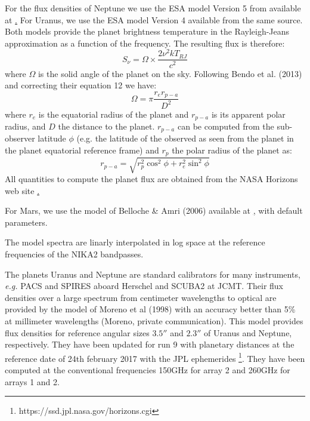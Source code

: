 For the flux densities of Neptune we use the ESA model Version 5 from
available at
\href{https://www.cosmos.esa.int/web/herschel/calibrator-models}. For
Uranus, we use the ESA model Version 4 available from the same
source. 
Both models provide the planet brightness temperature in the
Rayleigh-Jeans approximation as a function of
the frequency. The resulting flux is therefore:
\begin{equation}
S_{\nu} = \Omega \times \frac{2 \nu^{2} k T_{RJ}}{c^2}
\end{equation}
where $\Omega$ is the solid angle of the planet on the sky. Following
Bendo et al. (2013) and correcting their equation 12 we have:
\begin{equation}
\Omega = \pi \frac{r_{e} r_{p-a}}{D^{2}} 
\end{equation}
where $r_{e}$ is the equatorial radius of the planet and $r_{p-a}$ is
its apparent polar radius, and $D$ the distance to the
planet. $r_{p-a}$ can be computed from the sub-observer latitude $\phi$
(e.g. the latitude of the observed as seen from the planet in the
planet equatorial reference frame) and $r_{p}$ the polar radius of the
planet as:
\begin{equation}
r_{p-a} = \sqrt{r_{p}^2 \cos^{2}\phi + r_{e}^2 \sin^{2} \phi}
\end{equation}
All quantities to compute the planet flux are obtained from the NASA
Horizons web site \href{}. 

For Mars, we use the model of Belloche \&  Amri (2006) available at
\href{http://www.lesia.obspm.fr/perso/emmanuel-lellouch/mars/index.php},
with default parameters.

 
The model spectra are linarly interpolated in log space at the
reference frequencies of the NIKA2 bandpasses.






The planets Uranus and Neptune are standard calibrators for many instruments,
{\it e.g.} PACS and SPIRES aboard Herschel and SCUBA2 at JCMT.
Their flux densities over a large spectrum from centimeter wavelengths to optical
are provided by the model of Moreno et al (1998) with an accuracy better than
5\% at millimeter wavelengths (Moreno, private communication).
This model provides flux densities for reference angular sizes $3.5''$
and $2.3''$ of Uranus and Neptune, respectively. They have been updated for run 9
with planetary distances at the reference date of 24th february 2017 with 
the JPL ephemerides \footnote{https://ssd.jpl.nasa.gov/horizons.cgi}.
They have been computed at the conventional frequencies 150GHz for array 2 and 260GHz for arrays 1 and 2.

